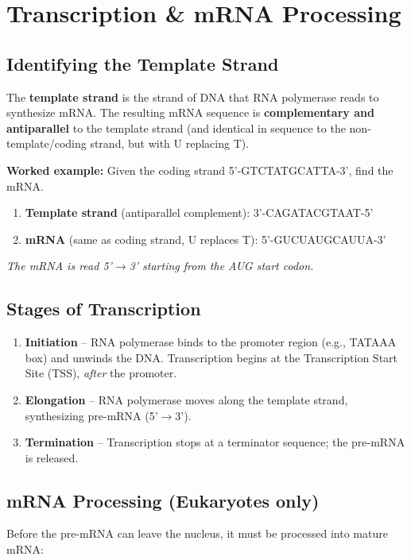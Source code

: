 \documentclass[11pt, letterpaper]{article}
\begin{document}
\section*{Transcription \& mRNA Processing}

\subsection*{Identifying the Template Strand}
The \textbf{template strand} is the strand of DNA that RNA polymerase reads to synthesize mRNA. The resulting mRNA sequence is \textbf{complementary and antiparallel} to the template strand (and identical in sequence to the non-template/coding strand, but with U replacing T).

\begin{tcolorbox}[colback=part4bg, colframe=sectionorange, arc=3pt, boxrule=1pt]
\textbf{Worked example:} Given the coding strand 5'-GTCTATGCATTA-3', find the mRNA.
\begin{enumerate}[noitemsep]
  \item \textbf{Template strand} (antiparallel complement): 3'-CAGATACGTAAT-5'
  \item \textbf{mRNA} (same as coding strand, U replaces T): 5'-GUCUAUGCAUUA-3'
\end{enumerate}
\textit{The mRNA is read 5'$\to$3' starting from the AUG start codon.}
\end{tcolorbox}

\subsection*{Stages of Transcription}
\begin{enumerate}[noitemsep]
  \item \textbf{Initiation} -- RNA polymerase binds to the promoter region (e.g., TATAAA box) and unwinds the DNA. Transcription begins at the Transcription Start Site (TSS), \emph{after} the promoter.
  \item \textbf{Elongation} -- RNA polymerase moves along the template strand, synthesizing pre-mRNA (5'$\to$3').
  \item \textbf{Termination} -- Transcription stops at a terminator sequence; the pre-mRNA is released.
\end{enumerate}

\subsection*{mRNA Processing (Eukaryotes only)}
Before the pre-mRNA can leave the nucleus, it must be processed into mature mRNA:
\end{document}
